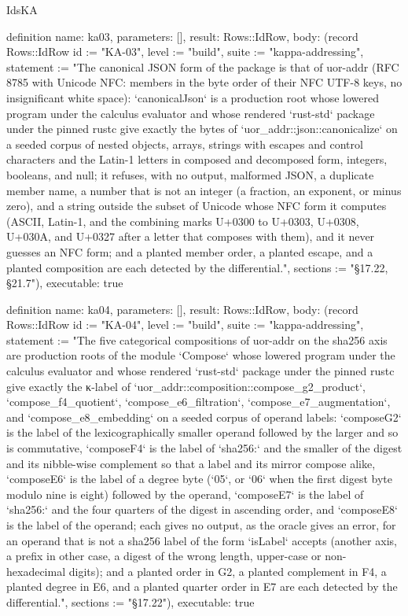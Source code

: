 \begin{lexlean}{IdsKA}
\begin{semanticmodule}
definition{
  name: ka03,
  parameters: [],
  result: Rows::IdRow,
  body: (record Rows::IdRow {id := "KA-03", level := "build", suite := "kappa-addressing", statement := "The canonical JSON form of the package is that of uor-addr (RFC 8785 with Unicode NFC: members in the byte order of their NFC UTF-8 keys, no insignificant white space): `canonicalJson` is a production root whose lowered program under the calculus evaluator and whose rendered `rust-std` package under the pinned rustc give exactly the bytes of `uor_addr::json::canonicalize` on a seeded corpus of nested objects, arrays, strings with escapes and control characters and the Latin-1 letters in composed and decomposed form, integers, booleans, and null; it refuses, with no output, malformed JSON, a duplicate member name, a number that is not an integer (a fraction, an exponent, or minus zero), and a string outside the subset of Unicode whose NFC form it computes (ASCII, Latin-1, and the combining marks U+0300 to U+0303, U+0308, U+030A, and U+0327 after a letter that composes with them), and it never guesses an NFC form; and a planted member order, a planted escape, and a planted composition are each detected by the differential.", sections := "§17.22, §21.7"}),
  executable: true
}

definition{
  name: ka04,
  parameters: [],
  result: Rows::IdRow,
  body: (record Rows::IdRow {id := "KA-04", level := "build", suite := "kappa-addressing", statement := "The five categorical compositions of uor-addr on the sha256 axis are production roots of the module `Compose` whose lowered program under the calculus evaluator and whose rendered `rust-std` package under the pinned rustc give exactly the κ-label of `uor_addr::composition::compose_g2_product`, `compose_f4_quotient`, `compose_e6_filtration`, `compose_e7_augmentation`, and `compose_e8_embedding` on a seeded corpus of operand labels: `composeG2` is the label of the lexicographically smaller operand followed by the larger and so is commutative, `composeF4` is the label of `sha256:` and the smaller of the digest and its nibble-wise complement so that a label and its mirror compose alike, `composeE6` is the label of a degree byte (`05`, or `06` when the first digest byte modulo nine is eight) followed by the operand, `composeE7` is the label of `sha256:` and the four quarters of the digest in ascending order, and `composeE8` is the label of the operand; each gives no output, as the oracle gives an error, for an operand that is not a sha256 label of the form `isLabel` accepts (another axis, a prefix in other case, a digest of the wrong length, upper-case or non-hexadecimal digits); and a planted order in G2, a planted complement in F4, a planted degree in E6, and a planted quarter order in E7 are each detected by the differential.", sections := "§17.22"}),
  executable: true
}


\end{semanticmodule}
\end{lexlean}
